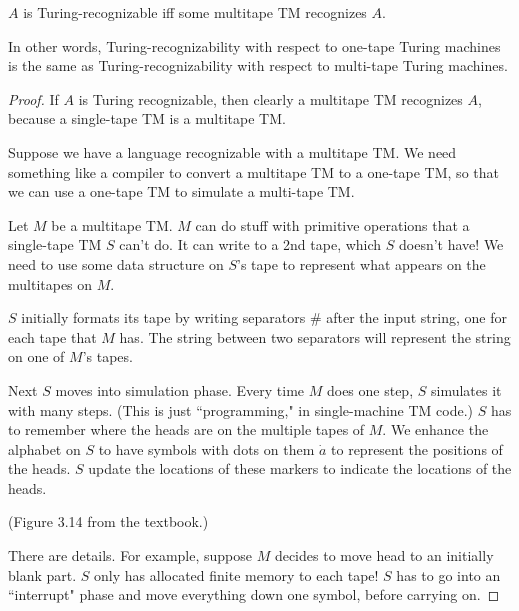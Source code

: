 \begin{thm}
$A$ is Turing-recognizable iff some multitape TM recognizes $A$.
\end{thm}
In other words, Turing-recognizability with respect to one-tape Turing machines is the same as Turing-recognizability with respect to multi-tape Turing machines.
\begin{proof}
If $A$ is Turing recognizable, then clearly a multitape TM recognizes $A$, because a single-tape TM is a multitape TM.

Suppose we have a language recognizable with a multitape TM.
We need something like a compiler to convert a multitape TM to a one-tape TM, so that we can use a one-tape TM to simulate a multi-tape TM.

Let $M$ be a multitape TM. 
$M$ can do stuff with primitive operations that a single-tape TM $S$ can't do. It can write to a 2nd tape, which $S$ doesn't have! We need to use some data structure on $S$'s tape to  represent what appears on the multitapes on $M$.

$S$ initially formats its tape by writing separators $\#$ after the input string, one for each tape that $M$ has. The string between two separators will represent the string on one of $M$'s tapes.


Next $S$ moves into simulation phase. Every time $M$ does one step, $S$ simulates it with many steps. (This is just ``programming," in single-machine TM code.)
$S$ has to remember where the heads are on the multiple tapes of $M$. We enhance the alphabet on $S$ to have symbols with dots on them $\dot{a}$ to represent the positions of the heads. $S$ update the locations of these markers to indicate the  locations of the heads.

(Figure 3.14 from the textbook.)

There are details. For example, suppose $M$ decides to move head to an initially blank part. $S$ only has allocated finite memory to each tape! $S$ has to go into an ``interrupt" phase and move everything down one symbol, before carrying on. 
\end{proof}

